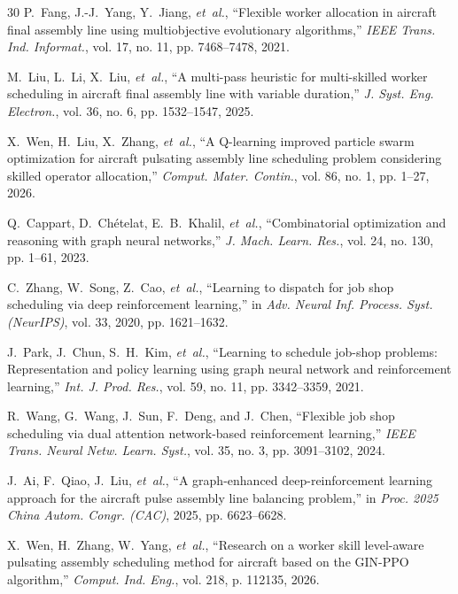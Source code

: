 \documentclass[journal,10pt]{IEEEtran}
\begin{document}
\begin{thebibliography}{30}
P.~Fang, J.-J.~Yang, Y.~Jiang, \textit{et~al.}, ``Flexible worker allocation in aircraft final assembly line using multiobjective evolutionary algorithms,'' \textit{IEEE Trans. Ind. Informat.}, vol. 17, no. 11, pp. 7468--7478, 2021.

M.~Liu, L.~Li, X.~Liu, \textit{et~al.}, ``A multi-pass heuristic for multi-skilled worker scheduling in aircraft final assembly line with variable duration,'' \textit{J. Syst. Eng. Electron.}, vol. 36, no. 6, pp. 1532--1547, 2025.

X.~Wen, H.~Liu, X.~Zhang, \textit{et~al.}, ``A Q-learning improved particle swarm optimization for aircraft pulsating assembly line scheduling problem considering skilled operator allocation,'' \textit{Comput. Mater. Contin.}, vol. 86, no. 1, pp. 1--27, 2026.

Q.~Cappart, D.~Ch\'etelat, E.~B.~Khalil, \textit{et~al.}, ``Combinatorial optimization and reasoning with graph neural networks,'' \textit{J. Mach. Learn. Res.}, vol. 24, no. 130, pp. 1--61, 2023.

C.~Zhang, W.~Song, Z.~Cao, \textit{et~al.}, ``Learning to dispatch for job shop scheduling via deep reinforcement learning,'' in \textit{Adv. Neural Inf. Process. Syst. (NeurIPS)}, vol. 33, 2020, pp. 1621--1632.

J.~Park, J.~Chun, S.~H.~Kim, \textit{et~al.}, ``Learning to schedule job-shop problems: Representation and policy learning using graph neural network and reinforcement learning,'' \textit{Int. J. Prod. Res.}, vol. 59, no. 11, pp. 3342--3359, 2021.

R.~Wang, G.~Wang, J.~Sun, F.~Deng, and J.~Chen, ``Flexible job shop scheduling via dual attention network-based reinforcement learning,'' \textit{IEEE Trans. Neural Netw. Learn. Syst.}, vol. 35, no. 3, pp. 3091--3102, 2024.

J.~Ai, F.~Qiao, J.~Liu, \textit{et~al.}, ``A graph-enhanced deep-reinforcement learning approach for the aircraft pulse assembly line balancing problem,'' in \textit{Proc. 2025 China Autom. Congr. (CAC)}, 2025, pp. 6623--6628.

X.~Wen, H.~Zhang, W.~Yang, \textit{et~al.}, ``Research on a worker skill level-aware pulsating assembly scheduling method for aircraft based on the GIN-PPO algorithm,'' \textit{Comput. Ind. Eng.}, vol. 218, p. 112135, 2026.


\end{thebibliography}
\end{document}
